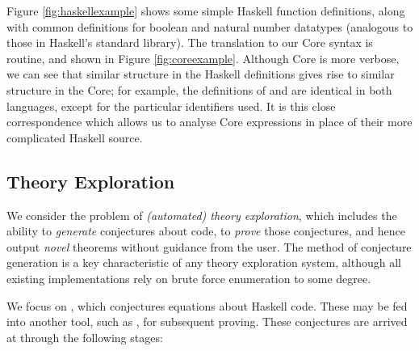 Figure \ref{fig:haskellexample} shows some simple Haskell function definitions, along with common definitions for boolean and natural number datatypes (analogous to those in Haskell's standard library). The translation to our Core syntax is routine, and shown in Figure \ref{fig:coreexample}. Although Core is more verbose, we can see that similar structure in the Haskell definitions gives rise to similar structure in the Core; for example, the definitions of  and  are identical in both languages, except for the particular identifiers used. It is this close correspondence which allows us to analyse Core expressions in place of their more complicated Haskell source.

\subsection{Theory Exploration}
\label{sec:theoryexploration}

We consider the problem of \emph{(automated) theory exploration}, which includes the ability to \emph{generate} conjectures about code, to \emph{prove} those conjectures, and hence output \emph{novel} theorems without guidance from the user. The method of conjecture generation is a key characteristic of any theory exploration system, although all existing implementations rely on brute force enumeration to some degree.

We focus on \qspec{} \cite{QuickSpec}, which conjectures equations about Haskell code. These may be fed into another tool, such as \hspec{}, for subsequent proving. These conjectures are arrived at through the following stages:

\iffalse %
 V \in Var
 F \in Fun
 T \in Term
 T ::= V | F | T1 T2

 Term ::= VAR | Const | Fun (Term)
or
 Term t ::= x | f | t t'
\fi

